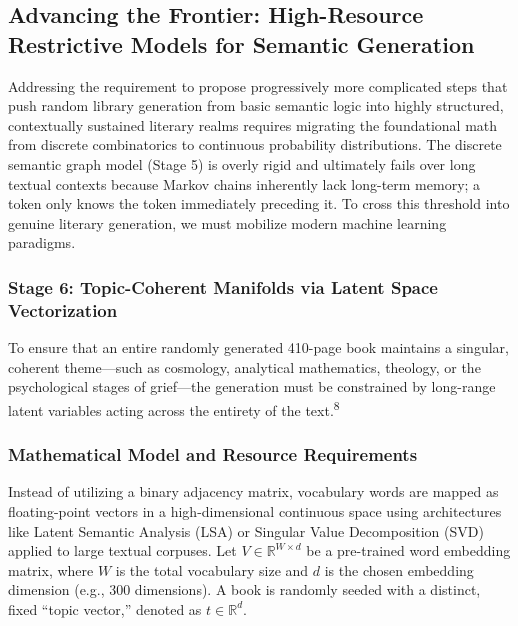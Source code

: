 \documentclass[
  11pt,
  a4paper,
]{article}
\begin{document}
\subsection{Advancing the Frontier: High-Resource Restrictive Models for Semantic Generation}\label{advancing-the-frontier-high-resource-restrictive-models-for-semantic-generation}

Addressing the requirement to propose progressively more complicated steps that push random library generation from basic semantic logic into highly structured, contextually sustained literary realms requires migrating the foundational math from discrete combinatorics to continuous probability distributions. The discrete semantic graph model (Stage 5) is overly rigid and ultimately fails over long textual contexts because Markov chains inherently lack long-term memory; a token only knows the token immediately preceding it. To cross this threshold into genuine literary generation, we must mobilize modern machine learning paradigms.

\subsubsection{Stage 6: Topic-Coherent Manifolds via Latent Space Vectorization}\label{stage-6-topic-coherent-manifolds-via-latent-space-vectorization}

To ensure that an entire randomly generated 410-page book maintains a singular, coherent theme---such as cosmology, analytical mathematics, theology, or the psychological stages of grief---the generation must be constrained by long-range latent variables acting across the entirety of the text.\textsuperscript{8}

\subsubsection{Mathematical Model and Resource Requirements}\label{mathematical-model-and-resource-requirements}

Instead of utilizing a binary adjacency matrix, vocabulary words are mapped as floating-point vectors in a high-dimensional continuous space using architectures like Latent Semantic Analysis (LSA) or Singular Value Decomposition (SVD) applied to large textual corpuses. Let \(V \in \mathbb{R}^{W \times d}\) be a pre-trained word embedding matrix, where \(W\) is the total vocabulary size and \(d\) is the chosen embedding dimension (e.g., 300 dimensions). A book is randomly seeded with a distinct, fixed ``topic vector,'' denoted as \(t \in \mathbb{R}^d\).
\end{document}
